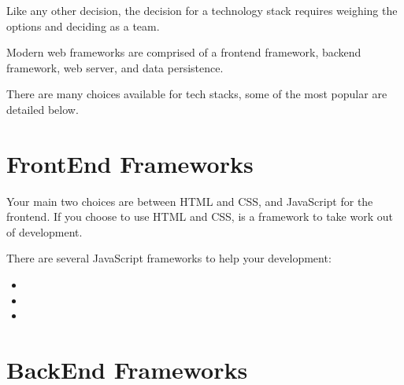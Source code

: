 \documentclass[letterpaper,10pt,english]{jupyterBook}
\begin{document}
\sphinxAtStartPar
Like any other decision, the decision for a technology stack requires
weighing the options and deciding as a team.

\sphinxAtStartPar
Modern web frameworks are comprised of a frontend framework, backend
framework, web server, and data persistence.

\sphinxAtStartPar
{}

\sphinxAtStartPar
{}

\sphinxAtStartPar
There are many choices available for tech stacks, some of the most
popular are detailed below.


\section{Front\sphinxhyphen{}End Frameworks}
\label{\detokenize{chapter_9/technology_stack:front-end-frameworks}}
\sphinxAtStartPar
Your main two choices are between HTML and CSS, and JavaScript for the
front\sphinxhyphen{}end. If you choose to use HTML and CSS,
is a framework to take work out of development.

\sphinxAtStartPar
There are several JavaScript frameworks to help your development:
\begin{itemize}
\item {} 
\sphinxAtStartPar
{}

\item {} 
\sphinxAtStartPar
{}

\item {} 
\sphinxAtStartPar
{}

\end{itemize}


\section{Back\sphinxhyphen{}End Frameworks}
\label{\detokenize{chapter_9/technology_stack:back-end-frameworks}}
\end{document}
